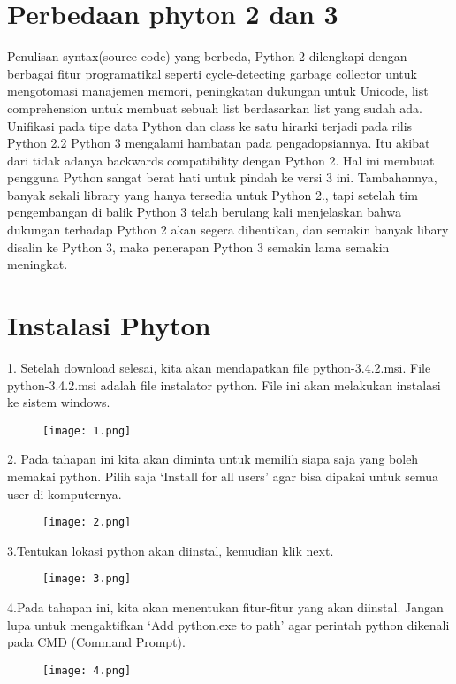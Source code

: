 \documentclass{wileySix}
\begin{document}
\chapter{Perbedaan phyton 2 dan 3}
Penulisan syntax(source code) yang berbeda, Python 2 dilengkapi dengan berbagai fitur programatikal seperti cycle-detecting garbage collector untuk mengotomasi manajemen memori, peningkatan dukungan untuk Unicode, list comprehension untuk membuat sebuah list berdasarkan list yang sudah ada. Unifikasi pada tipe data Python dan class ke satu hirarki terjadi pada rilis Python 2.2
Python 3 mengalami hambatan pada pengadopsiannya. Itu akibat dari tidak adanya backwards compatibility dengan Python 2. Hal ini membuat pengguna Python sangat berat hati untuk pindah ke versi 3 ini. Tambahannya, banyak sekali library yang hanya tersedia untuk Python 2., tapi setelah tim pengembangan di balik Python 3 telah berulang kali menjelaskan bahwa dukungan terhadap Python 2 akan segera dihentikan, dan semakin banyak libary disalin ke Python 3, maka penerapan Python 3 semakin lama semakin meningkat.

 	\chapter{Instalasi Phyton}
{
1. Setelah download selesai, kita akan mendapatkan file python-3.4.2.msi. File python-3.4.2.msi adalah file instalator python. File ini akan melakukan instalasi ke sistem windows.
}
\begin{figure}[!htbp]
\centering
\texttt{[image: 1.png]}
\label{penanda}
\end{figure}

2. Pada tahapan ini kita akan diminta untuk memilih siapa saja yang boleh memakai python.
Pilih saja ‘Install for all users’ agar bisa dipakai untuk semua user di komputernya.
\begin{figure}[!htbp]
\centering
\texttt{[image: 2.png]}
\label{penanda}
\end{figure}

3.Tentukan lokasi python akan diinstal, kemudian klik next.
\begin{figure}[!htbp]
\centering
\texttt{[image: 3.png]}
\label{penanda}
\end{figure}

4.Pada tahapan ini, kita akan menentukan fitur-fitur yang akan diinstal.
Jangan lupa untuk mengaktifkan ‘Add python.exe to path’ agar perintah python dikenali pada CMD (Command Prompt).
\begin{figure}[!htbp]
\centering
\texttt{[image: 4.png]}
\label{penanda}
\end{figure}
\end{document}
